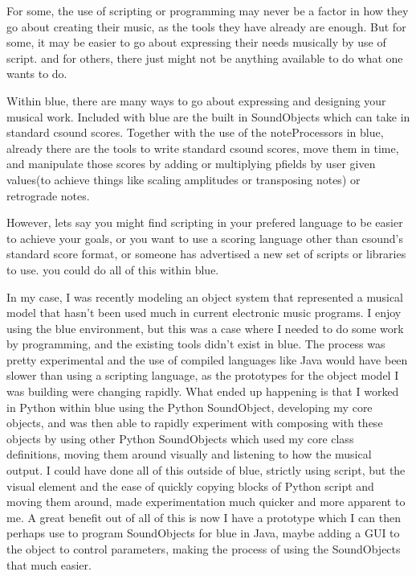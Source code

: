 For some, the use of scripting or programming may never be a factor in
how they go about creating their music, as the tools they have already
are enough. But for some, it may be easier to go about expressing their
needs musically by use of script. and for others, there just might not
be anything available to do what one wants to do.

Within blue, there are many ways to go about expressing and designing
your musical work. Included with blue are the built in SoundObjects
which can take in standard csound scores. Together with the use of the
noteProcessors in blue, already there are the tools to write standard
csound scores, move them in time, and manipulate those scores by adding
or multiplying pfields by user given values(to achieve things like
scaling amplitudes or transposing notes) or retrograde notes.

However, lets say you might find scripting in your prefered language to
be easier to achieve your goals, or you want to use a scoring language
other than csound's standard score format, or someone has advertised a
new set of scripts or libraries to use. you could do all of this within
blue.

In my case, I was recently modeling an object system that represented a
musical model that hasn't been used much in current electronic music
programs. I enjoy using the blue environment, but this was a case where
I needed to do some work by programming, and the existing tools didn't
exist in blue. The process was pretty experimental and the use of
compiled languages like Java would have been slower than using a
scripting language, as the prototypes for the object model I was
building were changing rapidly. What ended up happening is that I worked
in Python within blue using the Python SoundObject, developing my core
objects, and was then able to rapidly experiment with composing with
these objects by using other Python SoundObjects which used my core
class definitions, moving them around visually and listening to how the
musical output. I could have done all of this outside of blue, strictly
using script, but the visual element and the ease of quickly copying
blocks of Python script and moving them around, made experimentation
much quicker and more apparent to me. A great benefit out of all of this
is now I have a prototype which I can then perhaps use to program
SoundObjects for blue in Java, maybe adding a GUI to the object to
control parameters, making the process of using the SoundObjects that
much easier.

